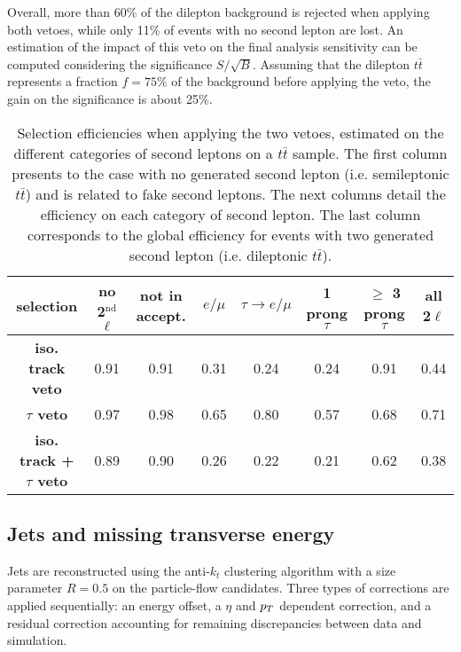     Overall, more than 60\% of the dilepton background is rejected when applying both
    vetoes, while only 11\% of events with no second lepton are lost. An estimation of the
    impact of this veto on the final analysis sensitivity can be computed considering the
    significance $S/\sqrt{B}$. Assuming that the dilepton $t\bar{t}$ represents a fraction
    $f = 75\%$ of the background before applying the veto, the gain on the significance
    is about 25\%.

    \begin{table}
    \hspace*{-1.2cm}
    \begin{tabular}{|c|c|ccccc|c|}
        \hline
        \textbf{selection}                  & no 2$^\text{nd}$ $\ell$ & not in accept. & $e/\mu$ & $\tau \rightarrow e/\mu$ & 1 prong $\tau $ & $\geq$ 3 prong $\tau$ & all 2$\ell$ \\
        \hline
        \textbf{iso. track veto}            & 0.91                    & 0.91  & 0.31  & 0.24  & 0.24  & 0.91  & 0.44  \\
        \textbf{$\tau$ veto}                & 0.97                    & 0.98  & 0.65  & 0.80  & 0.57  & 0.68  & 0.71  \\
        \hline
        \textbf{iso. track + $\tau$ veto}   & 0.89                    & 0.90  & 0.26  & 0.22  & 0.21  & 0.62  & 0.38 \\
        \hline
    \end{tabular}
        \caption{Selection efficiencies when applying the two vetoes, estimated on the different
        categories of second leptons on a $t\bar{t}$ sample. The first column presents to
        the case with no generated second lepton (i.e. semileptonic $t\bar{t}$) and is
        related to fake second leptons. The next columns detail the efficiency on each
        category of second lepton. The last column corresponds to the global efficiency
        for events with two generated second lepton (i.e. dileptonic $t\bar{t}$).}
        \label{tab:secondLeptonVetoPerformances}
    \end{table}

    \subsection{Jets and missing transverse energy \label{sec:analysisJetMET}}

       Jets are reconstructed using the anti-$k_t$ clustering algorithm with a size
       parameter $R = 0.5$ on the particle-flow candidates. Three types of corrections
       are applied sequentially: an energy offset, a $\eta$ and $p_T$ dependent correction,
       and a residual correction accounting for remaining discrepancies between data and simulation.

